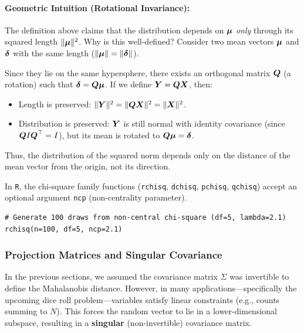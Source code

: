 \paragraph{Geometric Intuition (Rotational Invariance):}
The definition above claims that the distribution depends on $\boldsymbol{\mu}$ \textit{only} through its squared length $\|\boldsymbol{\mu}\|^2$. Why is this well-defined?
Consider two mean vectors $\boldsymbol{\mu}$ and $\boldsymbol{\delta}$ with the same length ($\|\boldsymbol{\mu}\| = \|\boldsymbol{\delta}\|$).

Since they lie on the same hypersphere, there exists an orthogonal matrix $\boldsymbol{Q}$ (a rotation) such that $\boldsymbol{\delta} = \boldsymbol{Q}\boldsymbol{\mu}$.
If we define $\boldsymbol{Y} = \boldsymbol{Q}\boldsymbol{X}$, then:
\begin{itemize}
    \item Length is preserved: $\|\boldsymbol{Y}\|^2 = \|\boldsymbol{Q}\boldsymbol{X}\|^2 = \|\boldsymbol{X}\|^2$.
    \item Distribution is preserved: $\boldsymbol{Y}$ is still normal with identity covariance (since $\boldsymbol{Q}I\boldsymbol{Q}^\top = I$), but its mean is rotated to $\boldsymbol{Q}\boldsymbol{\mu} = \boldsymbol{\delta}$.
\end{itemize}
Thus, the distribution of the squared norm depends only on the distance of the mean vector from the origin, not its direction.

\begin{note}[R Implementation]
    In \texttt{R}, the chi-square family functions (\texttt{rchisq}, \texttt{dchisq}, \texttt{pchisq}, \texttt{qchisq}) accept an optional argument \texttt{ncp} (non-centrality parameter).
    \begin{verbatim}
# Generate 100 draws from non-central chi-square (df=5, lambda=2.1)
rchisq(n=100, df=5, ncp=2.1)
    \end{verbatim}
\end{note}

\subsubsection{Projection Matrices and Singular Covariance}
\label{sub:Projection Matrices}

In the previous sections, we assumed the covariance matrix $\Sigma$ was invertible to define the Mahalanobis distance. However, in many applications—specifically the upcoming dice roll problem—variables satisfy linear constraints (e.g., counts summing to $N$). This forces the random vector to lie in a lower-dimensional subspace, resulting in a \textbf{singular} (non-invertible) covariance matrix.

